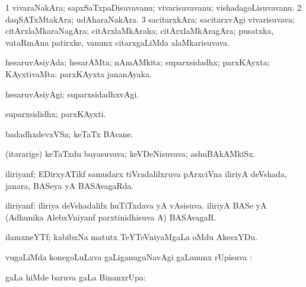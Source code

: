 \bentry
{}
\gl{\nA}
\bmng
\bnum
\num{1} vivaraNakAra; sapxSaTxpaDisuvavanu; vivarisuvavanu; vishadagoLisuvavanu. 
\num{2} daqSATxMtakAra; udAharaNakAra. 
\num{3} sacitarxkAra; sacitarxvAgi vivarisuvava; citArxlaMkaraNagAra; citArxlaMkAraka; citArxlaMkAragAra; pusatxka, vataRmAna patirxke, \mo vanunx citarxgaLiMda alaMkarisuvava. 
\enum
\emng
\eentry

\bentry
{}
\gl{\gu}
\bmng
hesaruvAsiyAda; hesarAMta; nAmAMkita; suparxsidadhx; parxKAyxta; KAyxtivaMta:  parxKAyxta jananAyaka. 
\emng
\eentry

\bentry
{}
\gl{\kirxvi}
\bmng
hesaruvAsiyAgi; suparxsidadhxvAgi. 
\emng
\eentry

\bentry
{}
\gl{\nA}
\bmng
suparxsididhx; parxKAyxti. 
\emng
\eentry

\bentry
{}
\gl{\nA}
\bmng
badadhxdevxVSa; keTaTx BAvane. 
\emng
\eentry

\bentry
{}
\gl{\nA}
\bmng
(itararige) keTaTxdu bayasuvava; keVDeNisuvava; ashuBAkAMkiSx. 
\emng
\eentry

\bentry
{}
\gl{\gu}
\bmng
iliriyanf; EDirxyATikf samudarx tiVradalilxruva pArxciVna iliriyA deVshada, janara, BASeya yA BASAvagaRda. 
\emng
\eentry

\bentry
{}
\gl{\nA}
\bmng
iliriyanf: 
\banum
{} iliriya deVshadalilx huTiTxdava yA vAsisuva. 
 iliriyA BASe yA (Adhunika AlebxVniyanf parxtinidhisuva A) BASAvagaR. 
\eanum
\emng
\eentry

\bentry
{}
\gl{\nA}
\bmng
ilamxneYTf; kabibxNa matutx TeYTeVniyaMgaLa oMdu AkesxYDu. 
\emng
\eentry

\bentry
{}
\gl{\saMkiSx}
\bmng
{} 
\emng
\eentry

\bentry
{}
\gl{\uparx}
\bmng
{} \mo vugaLiMda konegoLuLxva \gu gaLiganuguNavAgi \kirxvi gaLanunx rUpisuva \uparx:  
\emng
\eentry

\bentry
{}
\gl{\pUparx}
\bmng
{} gaLa hiMde baruva  \pUparx gaLa BinanxrUpa:  
\emng
\eentry

